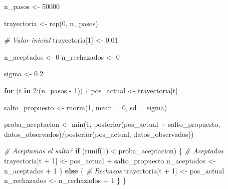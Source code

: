 \documentclass[
  12pt,
]{book}
\newenvironment{Shaded}{\begin{snugshade}}{\end{snugshade}}
\newcommand{\AttributeTok}[1]{\textcolor[rgb]{0.77,0.63,0.00}{#1}}
\newcommand{\CommentTok}[1]{\textcolor[rgb]{0.56,0.35,0.01}{\textit{#1}}}
\newcommand{\ControlFlowTok}[1]{\textcolor[rgb]{0.13,0.29,0.53}{\textbf{#1}}}
\newcommand{\DecValTok}[1]{\textcolor[rgb]{0.00,0.00,0.81}{#1}}
\newcommand{\FloatTok}[1]{\textcolor[rgb]{0.00,0.00,0.81}{#1}}
\newcommand{\FunctionTok}[1]{\textcolor[rgb]{0.00,0.00,0.00}{#1}}
\newcommand{\NormalTok}[1]{#1}
\newcommand{\OtherTok}[1]{\textcolor[rgb]{0.56,0.35,0.01}{#1}}
\newcommand{\SpecialCharTok}[1]{\textcolor[rgb]{0.00,0.00,0.00}{#1}}
\theoremstyle{definition}
\theoremstyle{definition}
\theoremstyle{definition}
\theoremstyle{remark}
\begin{document}
\begin{Shaded}
\begin{Highlighting}[]
\NormalTok{n\_pasos }\OtherTok{\textless{}{-}} \DecValTok{50000}

\NormalTok{trayectoria }\OtherTok{\textless{}{-}} \FunctionTok{rep}\NormalTok{(}\DecValTok{0}\NormalTok{, n\_pasos)}

\CommentTok{\# Valor inicial}
\NormalTok{trayectoria[}\DecValTok{1}\NormalTok{] }\OtherTok{\textless{}{-}} \FloatTok{0.01}

\NormalTok{n\_aceptados }\OtherTok{\textless{}{-}} \DecValTok{0}
\NormalTok{n\_rechazados }\OtherTok{\textless{}{-}} \DecValTok{0}


\NormalTok{sigma }\OtherTok{\textless{}{-}} \FloatTok{0.2}

\ControlFlowTok{for}\NormalTok{ (t }\ControlFlowTok{in} \DecValTok{2}\SpecialCharTok{:}\NormalTok{(n\_pasos }\SpecialCharTok{{-}} \DecValTok{1}\NormalTok{)) \{}
\NormalTok{    pos\_actual }\OtherTok{\textless{}{-}}\NormalTok{ trayectoria[t]}
    
\NormalTok{    salto\_propuesto }\OtherTok{\textless{}{-}} \FunctionTok{rnorm}\NormalTok{(}\DecValTok{1}\NormalTok{, }\AttributeTok{mean =} \DecValTok{0}\NormalTok{, }\AttributeTok{sd =}\NormalTok{ sigma)}
    
\NormalTok{    proba\_aceptacion }\OtherTok{\textless{}{-}} \FunctionTok{min}\NormalTok{(}\DecValTok{1}\NormalTok{, }\FunctionTok{posterior}\NormalTok{(pos\_actual }\SpecialCharTok{+} 
\NormalTok{        salto\_propuesto, datos\_observados)}\SpecialCharTok{/}\FunctionTok{posterior}\NormalTok{(pos\_actual, }
\NormalTok{        datos\_observados))}
    
    \CommentTok{\# Aceptamos el salto?}
    \ControlFlowTok{if}\NormalTok{ (}\FunctionTok{runif}\NormalTok{(}\DecValTok{1}\NormalTok{) }\SpecialCharTok{\textless{}}\NormalTok{ proba\_aceptacion) \{}
        \CommentTok{\# Aceptados}
\NormalTok{        trayectoria[t }\SpecialCharTok{+} \DecValTok{1}\NormalTok{] }\OtherTok{\textless{}{-}}\NormalTok{ pos\_actual }\SpecialCharTok{+}\NormalTok{ salto\_propuesto}
\NormalTok{        n\_aceptados }\OtherTok{\textless{}{-}}\NormalTok{ n\_aceptados }\SpecialCharTok{+} \DecValTok{1}
\NormalTok{    \} }\ControlFlowTok{else}\NormalTok{ \{}
        \CommentTok{\# Rechazos}
\NormalTok{        trayectoria[t }\SpecialCharTok{+} \DecValTok{1}\NormalTok{] }\OtherTok{\textless{}{-}}\NormalTok{ pos\_actual}
\NormalTok{        n\_rechazados }\OtherTok{\textless{}{-}}\NormalTok{ n\_rechazados }\SpecialCharTok{+} \DecValTok{1}
\NormalTok{    \}}
\NormalTok{\}}
\end{Highlighting}
\end{Shaded}
\end{document}
